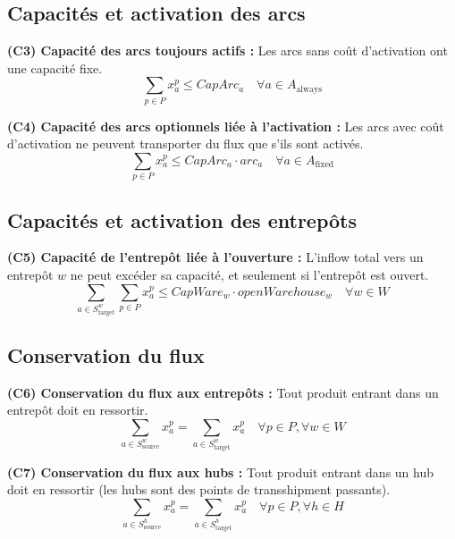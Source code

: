 \documentclass{article}
\begin{document}
\subsection{Capacités et activation des arcs}

\noindent\textbf{(C3) Capacité des arcs toujours actifs :}
Les arcs sans coût d'activation ont une capacité fixe.
\begin{equation}
    \sum_{p \in P} x_a^p \le CapArc_a \quad \forall a \in A_{\text{always}} \label{eq:arc_cap_always}
\end{equation}

\noindent\textbf{(C4) Capacité des arcs optionnels liée à l'activation :}
Les arcs avec coût d'activation ne peuvent transporter du flux que s'ils sont activés.
\begin{equation}
    \sum_{p \in P} x_a^p \le CapArc_a \cdot arc_a \quad \forall a \in A_{\text{fixed}} \label{eq:arc_cap_fixed}
\end{equation}

\subsection{Capacités et activation des entrepôts}

\noindent\textbf{(C5) Capacité de l'entrepôt liée à l'ouverture :}
L'inflow total vers un entrepôt $w$ ne peut excéder sa capacité, et seulement si l'entrepôt est ouvert.
\begin{equation}
    \sum_{a \in S_{\text{target}}^w} \sum_{p \in P} x_a^p \le CapWare_w \cdot openWarehouse_w \quad \forall w \in W \label{eq:wh_cap}
\end{equation}

\subsection{Conservation du flux}

\noindent\textbf{(C6) Conservation du flux aux entrepôts :}
Tout produit entrant dans un entrepôt doit en ressortir.
\begin{equation}
    \sum_{a \in S_{\text{source}}^w} x_a^p = \sum_{a \in S_{\text{target}}^w} x_a^p \quad \forall p \in P, \forall w \in W \label{eq:wh_flow}
\end{equation}

\noindent\textbf{(C7) Conservation du flux aux hubs :}
Tout produit entrant dans un hub doit en ressortir (les hubs sont des points de transshipment passants).
\begin{equation}
    \sum_{a \in S_{\text{source}}^h} x_a^p = \sum_{a \in S_{\text{target}}^h} x_a^p \quad \forall p \in P, \forall h \in H \label{eq:hub_flow}
\end{equation}
\end{document}
